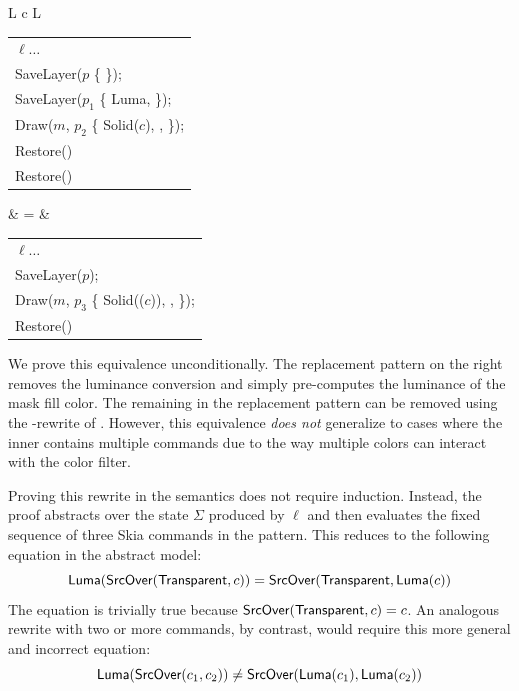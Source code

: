 \documentclass[main.tex]{subfiles}
\begin{document}
\begin{center}
  \begin{tabular}{L c L}
    \begin{tabular}{@{}l@{}}
      $\ell\ldots$ \\
      SaveLayer($p$ \{ \DstIn \}); \\
      \quad SaveLayer($p_1$ \{ \textsf{Luma}, \SrcOver \}); \\
      \quad \quad Draw($m$, $p_2$ \{ \textsf{Solid}($c$), \SrcOver, \Id \}); \\
      \quad Restore() \\
      Restore()
    \end{tabular}
    & =
    & \begin{tabular}{@{}l@{}}
      $\ell\ldots$ \\
      SaveLayer($p$); \\
      \quad Draw($m$, $p_3$ \{ Solid(\Luma{}($c$)), \SrcOver, \Id \}); \\
      Restore()
      \end{tabular}
  \end{tabular}
\end{center}

We prove this equivalence unconditionally.
The replacement pattern on the right
  removes the luminance conversion \SaveLayer
  and simply pre-computes the luminance of the mask fill color.
The remaining \SaveLayer in the replacement pattern
  can be removed using the \DstIn-\Clip rewrite
  of .
However, this equivalence \emph{does not} generalize
  to cases where the inner \SaveLayer contains
  multiple \Draw commands
  due to the way multiple colors can interact
  with the \Luma color filter.

Proving this rewrite in the \muskia semantics
  does not require induction.
Instead, the proof abstracts over
  the state $\Sigma$ produced by $\ell$
  and then evaluates the fixed sequence
  of three Skia commands in the pattern.
This reduces to the following equation in the abstract model:
\begin{equation*}
\textsf{Luma}(\textsf{SrcOver}(\textsf{Transparent}, c)) = \textsf{SrcOver}(\textsf{Transparent}, \textsf{Luma}(c))
\end{equation*}
The equation is trivially true
  because $\textsf{SrcOver}(\textsf{Transparent}, c) = c$.
An analogous rewrite with two or more \Draw commands,
  by contrast, would require this more general and incorrect equation:
\begin{equation*}
\textsf{Luma}(\textsf{SrcOver}(c_1, c_2)) \ne \textsf{SrcOver}(\textsf{Luma}(c_1), \textsf{Luma}(c_2))
\end{equation*}
\end{document}
